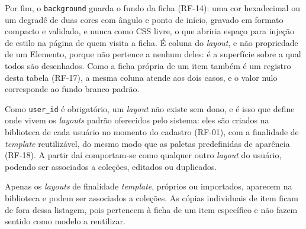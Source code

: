 Por fim, o \texttt{background} guarda o fundo da ficha (RF-14): uma cor hexadecimal ou um degradê de duas cores com ângulo e ponto de início, gravado em formato compacto e validado, e nunca como CSS livre, o que abriria espaço para injeção de estilo na página de quem visita a ficha. É coluna do \textit{layout}, e não propriedade de um Elemento, porque não pertence a nenhum deles: é a superfície sobre a qual todos são desenhados. Como a ficha própria de um item também é um registro desta tabela (RF-17), a mesma coluna atende aos dois casos, e o valor nulo corresponde ao fundo branco padrão.

Como \texttt{user\_id} é obrigatório, um \textit{layout} não existe sem dono, e é isso que define onde vivem os \textit{layouts} padrão oferecidos pelo sistema: eles são criados na biblioteca de cada usuário no momento do cadastro (RF-01), com a finalidade de \textit{template} reutilizável, do mesmo modo que as paletas predefinidas de aparência (RF-18). A partir daí comportam-se como qualquer outro \textit{layout} do usuário, podendo ser associados a coleções, editados ou duplicados.

Apenas os \textit{layouts} de finalidade \textit{template}, próprios ou importados, aparecem na biblioteca e podem ser associados a coleções. As cópias individuais de item ficam de fora dessa listagem, pois pertencem à ficha de um item específico e não fazem sentido como modelo a reutilizar.

